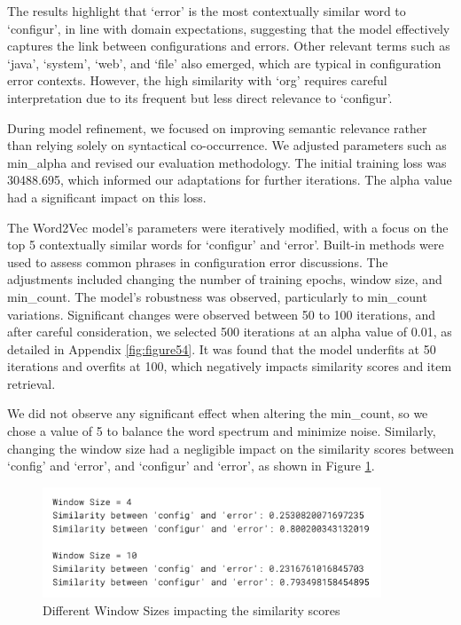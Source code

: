 \documentclass[english,bachelor]{swsLeipzig}
\begin{document}
The results highlight that `error' is the most contextually similar word to `configur', in line with domain expectations, suggesting that the model effectively captures the link between configurations and errors. Other relevant terms such as `java', `system', `web', and `file' also emerged, which are typical in configuration error contexts. However, the high similarity with `org' requires careful interpretation due to its frequent but less direct relevance to `configur'.

During model refinement, we focused on improving semantic relevance rather than relying solely on syntactical co-occurrence. We adjusted parameters such as min\_alpha and revised our evaluation methodology. The initial training loss was 30488.695, which informed our adaptations for further iterations. The alpha value had a significant impact on this loss.

The Word2Vec model's parameters were iteratively modified, with a focus on the top 5 contextually similar words for `configur' and `error'. Built-in methods were used to assess common phrases in configuration error discussions. The adjustments included changing the number of training epochs, window size, and min\_count. The model's robustness was observed, particularly to min\_count variations. Significant changes were observed between 50 to 100 iterations, and after careful consideration, we selected 500 iterations at an alpha value of 0.01, as detailed in Appendix \ref{fig:figure54}. It was found that the model underfits at 50 iterations and overfits at 100, which negatively impacts similarity scores and item retrieval.

We did not observe any significant effect when altering the min\_count, so we chose a value of 5 to balance the word spectrum and minimize noise. Similarly, changing the window size had a negligible impact on the similarity scores between `config' and `error', and `configur' and `error', as shown in Figure \ref{fig:figure55}.

\begin{figure}[h]
  \centering
  \includegraphics[width=0.9\textwidth]{images/windowres.png}
  \caption{Different Window Sizes impacting the similarity scores}
  \label{fig:figure55}
\end{figure}
\end{document}
